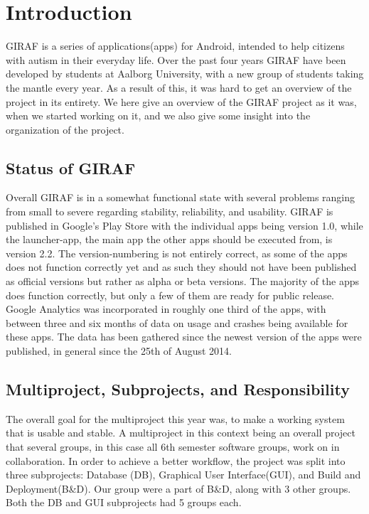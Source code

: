 \chapter{Introduction} \label{ChapIntroduction}
GIRAF is a series of applications(apps) for Android, intended to help citizens with autism in their everyday life. Over the past four years GIRAF have been developed by students at Aalborg University, with a new group of students taking the mantle every year. As a result of this, it was hard to get an overview of the project in its entirety. We here give an overview of the GIRAF project as it was, when we started working on it, and we also give some insight into the organization of the project.

\section{Status of GIRAF} %
Overall GIRAF is in a somewhat functional state with several problems ranging from small to severe regarding stability, reliability, and usability.
GIRAF is published in Google's Play Store with the individual apps being version 1.0, while the launcher-app, the main app the other apps should be executed from, is version 2.2. The version-numbering is not entirely correct, as some of the apps does not function correctly yet and as such they should not have been published as official versions but rather as alpha or beta versions. The majority of the apps does function correctly, but only a few of them are ready for public release.
Google Analytics was incorporated in roughly one third of the apps, with between three and six months of data on usage and crashes being available for these apps. The data has been gathered since the newest version of the apps were published, in general since the 25th of August 2014.

\section{Multiproject, Subprojects, and Responsibility} %
The overall goal for the multiproject this year was, to make a working system that is usable and stable. A multiproject in this context being an overall project that several groups, in this case all 6th semester software groups, work on in collaboration. In order to achieve a better workflow, the project was split into three subprojects: Database (DB), Graphical User Interface(GUI), and Build and Deployment(B\&D). Our group were a part of B\&D, along with 3 other groups. Both the DB and GUI subprojects had 5 groups each.

